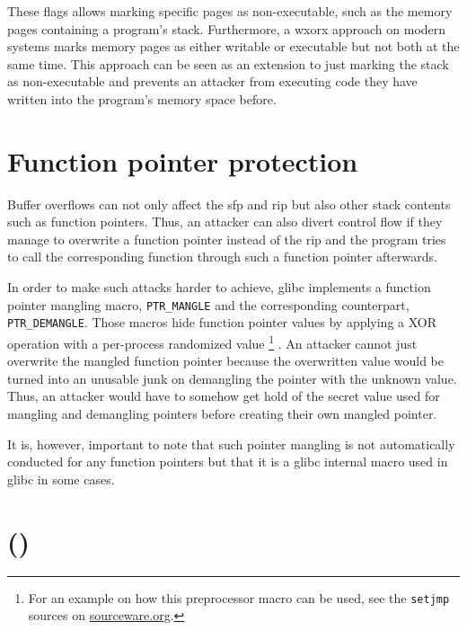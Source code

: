 These flags allows marking specific pages as non-executable, such as the memory pages containing a program's stack.
Furthermore, a \gls{wxorx} approach on modern systems marks memory pages as either writable or executable but not both at the same time.
This approach can be seen as an extension to just marking the stack as non-executable and prevents an attacker from executing code they have written into the program's memory space before.

\section{Function pointer protection}
\label{sec:function-pointer-protection-current}

Buffer overflows can not only affect the \acrfull{sfp} and \acrfull{rip} but also other stack contents such as function pointers.
Thus, an attacker can also divert control flow if they manage to overwrite a function pointer instead of the \gls{rip} and the program tries to call the corresponding function through such a function pointer afterwards.

In order to make such attacks harder to achieve, \gls{glibc} implements a function pointer mangling macro, \texttt{PTR\_MANGLE} and the corresponding counterpart, \texttt{PTR\_DEMANGLE}.
Those macros hide function pointer values by applying a XOR operation with a per-process randomized value%
	\footnote{For an example on how this preprocessor macro can be used, see the \texttt{setjmp} sources on \href{https://sourceware.org/git/?p=glibc.git;a=blob;f=sysdeps/x86_64/setjmp.S;h=b4e05e0f0c1bb2184cf872a6a26eb18de6cfeba1;hb=9ea3686266dca3f004ba874745a4087a89682617}{sourceware.org}.}
\cite{Newton2013}.
An attacker cannot just overwrite the mangled function pointer because the overwritten value would be turned into an unusable junk on demangling the pointer with the unknown value.
Thus, an attacker would have to somehow get hold of the secret value used for mangling and demangling pointers before creating their own mangled pointer.

It is, however, important to note that such pointer mangling is not automatically conducted for any function pointers but that it is a \gls{glibc} internal macro used in \gls{glibc} in some cases.

\section{ ()}
\label{sec:aslr-and-pie}

